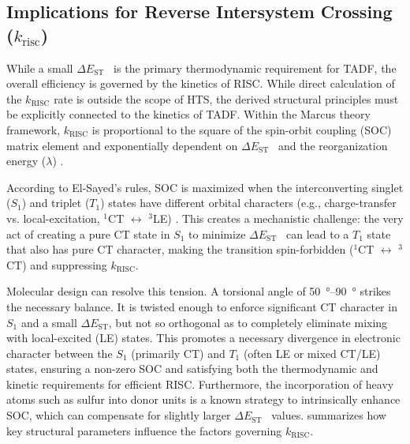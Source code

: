 \documentclass[journal=jcisd8,manuscript=article,keywords=true]{achemso}
\newcommand{\deltaest}{$\Delta E_{\text{ST}}$}
\begin{document}
\subsection{Implications for Reverse Intersystem Crossing ($k_{\text{risc}}$)}

While a small \deltaest~ is the primary thermodynamic requirement for TADF, the overall
efficiency is governed by the kinetics of RISC. While direct calculation of the
$k_{\text{RISC}}$ rate is outside the scope of HTS, the derived structural principles must
be explicitly connected to the kinetics of TADF. Within the Marcus theory framework,
$k_{\text{RISC}}$ is proportional to the square of the spin-orbit coupling (SOC) matrix
element and exponentially dependent on \deltaest~ and the reorganization energy
($\lambda$) \cite{Marcus-RISC-Theory-1985}.

According to El-Sayed's rules, SOC is maximized when the interconverting singlet ($S_1$)
and triplet ($T_1$) states have different orbital characters (e.g., charge-transfer vs.
local-excitation, $^1$CT $\leftrightarrow$ $^3$LE) \cite{El-Sayed-Rules-1968}. This
creates a mechanistic challenge: the very act of creating a pure CT state in $S_1$ to
minimize \deltaest~ can lead to a $T_1$ state that also has pure CT character, making the
transition spin-forbidden ($^1$CT $\leftrightarrow$ $^3$CT) and suppressing
$k_{\text{RISC}}$.

Molecular design can resolve this tension. A torsional angle of \qtyrange{50}{90}{\degree} strikes the necessary balance. It is twisted enough to enforce significant CT character in $S_1$ and a small
\deltaest, but not so orthogonal as to completely eliminate mixing with local-excited (LE)
states. This promotes a necessary divergence in electronic character between the $S_1$
(primarily CT) and $T_1$ (often LE or mixed CT/LE) states, ensuring a non-zero SOC and
satisfying both the thermodynamic and kinetic requirements for efficient RISC.
Furthermore, the incorporation of heavy atoms such as sulfur into donor units is a known
strategy to intrinsically enhance SOC, which can compensate for slightly larger \deltaest~
values.  summarizes how key structural parameters influence the
factors governing $k_{\text{RISC}}$.
\end{document}

